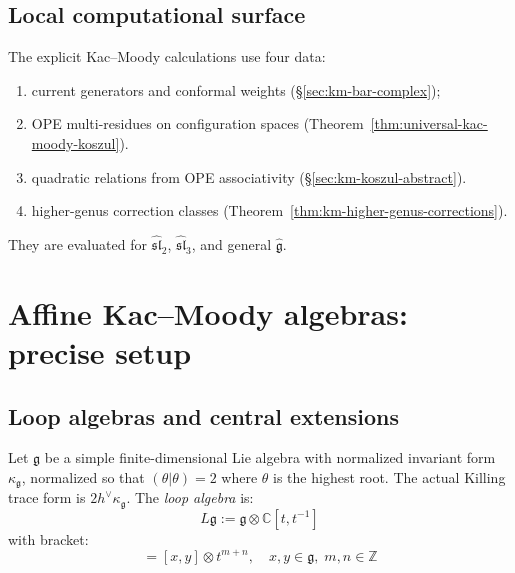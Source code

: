 \subsection{Local computational surface}

\begin{remark}
The explicit Kac--Moody calculations use four data:
\begin{enumerate}[label=(\roman*)]
\item current generators and conformal weights (\S\ref{sec:km-bar-complex});
\item OPE multi-residues on configuration spaces
 (Theorem~\ref{thm:universal-kac-moody-koszul}).
\item quadratic relations from OPE associativity
 (\S\ref{sec:km-koszul-abstract}).
\item higher-genus correction classes
 (Theorem~\ref{thm:km-higher-genus-corrections}).
\end{enumerate}
They are evaluated for $\widehat{\mathfrak{sl}}_2$,
$\widehat{\mathfrak{sl}}_3$, and general $\widehat{\mathfrak{g}}$.
\end{remark}

\section{Affine Kac--Moody algebras: precise setup}

\subsection{Loop algebras and central extensions}

\begin{definition}\label{def:loop-algebra}
Let $\mathfrak{g}$ be a simple finite-dimensional Lie algebra with
normalized invariant form $\kappa_{\mathfrak{g}}$, normalized so that
$(\theta|\theta) = 2$ where $\theta$ is the highest root. The actual
Killing trace form is \(2h^\vee\kappa_{\mathfrak g}\). The
\emph{loop algebra} is:
\begin{equation}
L\mathfrak{g} := \mathfrak{g} \otimes \mathbb{C}[t,t^{-1}]
\end{equation}
with bracket:
\begin{equation}
[x \otimes t^m, y \otimes t^n] = [x,y] \otimes t^{m+n}, \quad x,y \in \mathfrak{g}, \; m,n \in \mathbb{Z}
\end{equation}
\end{definition}

